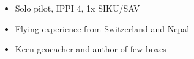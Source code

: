 \documentclass[10pt,a4paper]{altacv}
\begin{document}
\begin{itemize}
  \item{Solo pilot, IPPI 4, 1x SIKU/SAV}
  \item {Flying experience from Switzerland and Nepal}
\end{itemize}

\divider

\begin{itemize}
  \item{Keen geocacher and author of few boxes}
\end{itemize}











\end{document}
